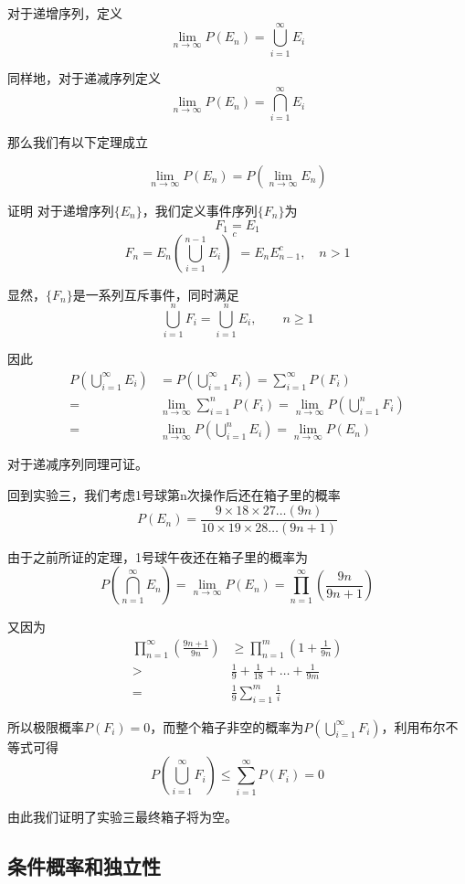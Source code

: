 \documentclass[UTF8]{ctexart}
\begin{document}
对于递增序列，定义
$$\mathop{lim}\limits_{n\to \infty}P(E_{n})=\bigcup_{i=1}^{\infty}E_{i} $$

同样地，对于递减序列定义
$$\mathop{lim}\limits_{n\to \infty}P(E_{n})=\bigcap_{i=1}^{\infty}E_{i} $$

那么我们有以下定理成立

$$\mathop{lim}\limits_{n\to \infty}P(E_{n})=P(\mathop{lim}\limits_{n\to \infty}E_{n}) $$

证明 对于递增序列$\{E_{n}\}$，我们定义事件序列$\{F_{n}\}$为
$$F_{1}=E_{1}$$
$$F_{n}=E_{n}(\bigcup_{i=1}^{n-1}E_{i} )^{c}=E_{n}E_{n-1}^{c},\quad n>1$$

显然，$\{F_{n}\}$是一系列互斥事件，同时满足
$$\bigcup_{i=1}^{n}F_{i}=\bigcup_{i=1}^{n}E_{i},\qquad n\geq 1$$

因此
$$\begin{aligned}
P(\bigcup_{i=1}^{\infty }E_{i})&=P(\bigcup_{i=1}^{\infty }F_{i})=\sum_{i=1}^{\infty }P(F_{i})\\
=&\mathop{lim}\limits_{n\to \infty }\sum_{i=1}^{n}P(F_{i})=\mathop{lim}\limits_{n\to \infty }P(\bigcup_{i=1}^{n}F_{i})\\
=&\mathop{lim}\limits_{n\to \infty}P(\bigcup_{i=1}^{n}E_{i})=\mathop{lim}\limits_{n\to \infty}P(E_{n})
\end{aligned}$$

对于递减序列同理可证。

回到实验三，我们考虑1号球第n次操作后还在箱子里的概率
$$P(E_{n})=\frac{9\times 18 \times 27\ldots (9n)}{10\times 19 \times 28\ldots (9n+1)}$$

由于之前所证的定理，1号球午夜还在箱子里的概率为
$$P(\bigcap_{n=1}^{\infty }E_{n})=\mathop{lim}\limits_{n\to \infty }P(E_{n})=\prod_{n=1}^{\infty }(\frac{9n}{9n+1})$$

又因为
$$\begin{aligned}
\prod_{n=1}^{\infty }(\frac{9n+1}{9n})&\geq \prod_{n=1}^{m}(1+\frac{1}{9n})\\
>&\frac{1}{9}+\frac{1}{18}+\ldots +\frac{1}{9m}\\
=&\frac{1}{9}\sum_{i=1}^{m}\frac{1}{i}
\end{aligned}$$

所以极限概率$P(F_{i})=0$，而整个箱子非空的概率为$P(\bigcup_{i=1}^{\infty }F_{i})$，利用布尔不等式可得
$$P(\bigcup_{i=1}^{\infty }F_{i})\leq \sum_{i=1}^{\infty }P(F_{i})=0$$

由此我们证明了实验三最终箱子将为空。

\subsection{条件概率和独立性}
\end{document}
